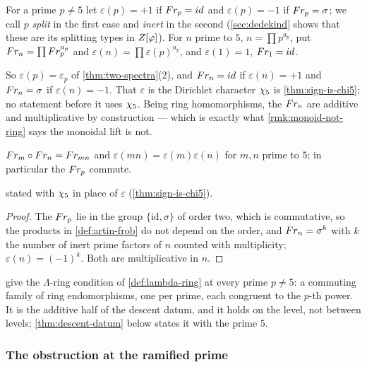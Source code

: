 \begin{definition}\label{def:artin-frob}
For a prime $p\ne5$ let $\varepsilon(p)=+1$ if $Fr_p=id$ and $\varepsilon(p)=-1$ if
$Fr_p=\sigma$; we call $p$ \emph{split} in the first case and \emph{inert} in the second
(\cref{sec:dedekind} shows that these are its splitting types in $Z[\varphi]$).  For $n$ prime to $5$,
$n=\prod p^{a_p}$, put $Fr_n=\prod Fr_p^{a_p}$ and $\varepsilon(n)=\prod\varepsilon(p)^{a_p}$,
and $\varepsilon(1)=1$, $Fr_1=id$.
\end{definition}

So $\varepsilon(p)=\varepsilon_p$ of \cref{thm:two-spectra}(2), and
$Fr_n=id$ if $\varepsilon(n)=+1$ and $Fr_n=\sigma$ if $\varepsilon(n)=-1$.  That
$\varepsilon$ is the Dirichlet character $\chi_5$ is \cref{thm:sign-is-chi5}; no statement before it
uses $\chi_5$.  Being ring homomorphisms, the $Fr_n$ are additive and multiplicative by
construction --- which is exactly what \cref{rmk:monoid-not-ring} says the monoidal lift is not.

\begin{proposition}\label{prop:frob-compose}
$Fr_m\circ Fr_n=Fr_{mn}$ and $\varepsilon(mn)=\varepsilon(m)\varepsilon(n)$ for $m,n$
prime to $5$; in particular the $Fr_p$ commute.
\end{proposition}
stated with
$\chi_5$ in place of $\varepsilon$ (\cref{thm:sign-is-chi5}).
\begin{proof}
The $Fr_p$ lie in the group $\{\mathrm{id},\sigma\}$ of order two, which is commutative, so the
products in \cref{def:artin-frob} do not depend on the order, and $Fr_n=\sigma^{k}$ with $k$ the
number of inert prime factors of $n$ counted with multiplicity; $\varepsilon(n)=(-1)^k$.  Both are
multiplicative in $n$.
\end{proof}

 give the $\Lambda$-ring condition of
\cref{def:lambda-ring} at every prime $p\ne5$: a
commuting family of ring endomorphisms, one per prime, each congruent to the
$p$-th power.  It is the additive half of the descent datum, and it holds on the
level, not between levels; \cref{thm:descent-datum} below states it with the prime $5$.

\subsubsection{The obstruction at the ramified prime}

